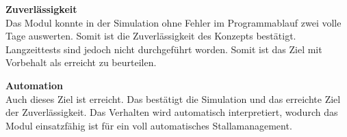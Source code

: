 \textbf{Zuverlässigkeit}\\
Das Modul konnte in der Simulation ohne Fehler im Programmablauf zwei volle Tage auswerten. Somit ist die Zuverlässigkeit des Konzepts bestätigt. Langzeittests sind jedoch nicht durchgeführt worden. Somit ist das Ziel mit Vorbehalt als erreicht zu beurteilen. 
\par

\textbf{Automation}\\
Auch dieses Ziel ist erreicht. Das bestätigt die Simulation und das erreichte Ziel der Zuverlässigkeit. Das Verhalten wird automatisch interpretiert, wodurch das Modul einsatzfähig ist für ein voll automatisches Stallamanagement. \par



